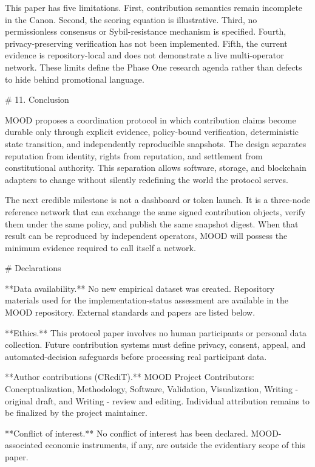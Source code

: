 \documentclass[10pt,a4paper]{article}
\begin{document}
This paper has five limitations. First, contribution semantics remain incomplete in the Canon. Second, the scoring equation is illustrative. Third, no permissionless consensus or Sybil-resistance mechanism is specified. Fourth, privacy-preserving verification has not been implemented. Fifth, the current evidence is repository-local and does not demonstrate a live multi-operator network. These limits define the Phase One research agenda rather than defects to hide behind promotional language.

\# 11. Conclusion

MOOD proposes a coordination protocol in which contribution claims become durable only through explicit evidence, policy-bound verification, deterministic state transition, and independently reproducible snapshots. The design separates reputation from identity, rights from reputation, and settlement from constitutional authority. This separation allows software, storage, and blockchain adapters to change without silently redefining the world the protocol serves.

The next credible milestone is not a dashboard or token launch. It is a three-node reference network that can exchange the same signed contribution objects, verify them under the same policy, and publish the same snapshot digest. When that result can be reproduced by independent operators, MOOD will possess the minimum evidence required to call itself a network.

\# Declarations

**Data availability.** No new empirical dataset was created. Repository materials used for the implementation-status assessment are available in the MOOD repository. External standards and papers are listed below.

**Ethics.** This protocol paper involves no human participants or personal data collection. Future contribution systems must define privacy, consent, appeal, and automated-decision safeguards before processing real participant data.

**Author contributions (CRediT).** MOOD Project Contributors: Conceptualization, Methodology, Software, Validation, Visualization, Writing - original draft, and Writing - review and editing. Individual attribution remains to be finalized by the project maintainer.

**Conflict of interest.** No conflict of interest has been declared. MOOD-associated economic instruments, if any, are outside the evidentiary scope of this paper.
\end{document}
